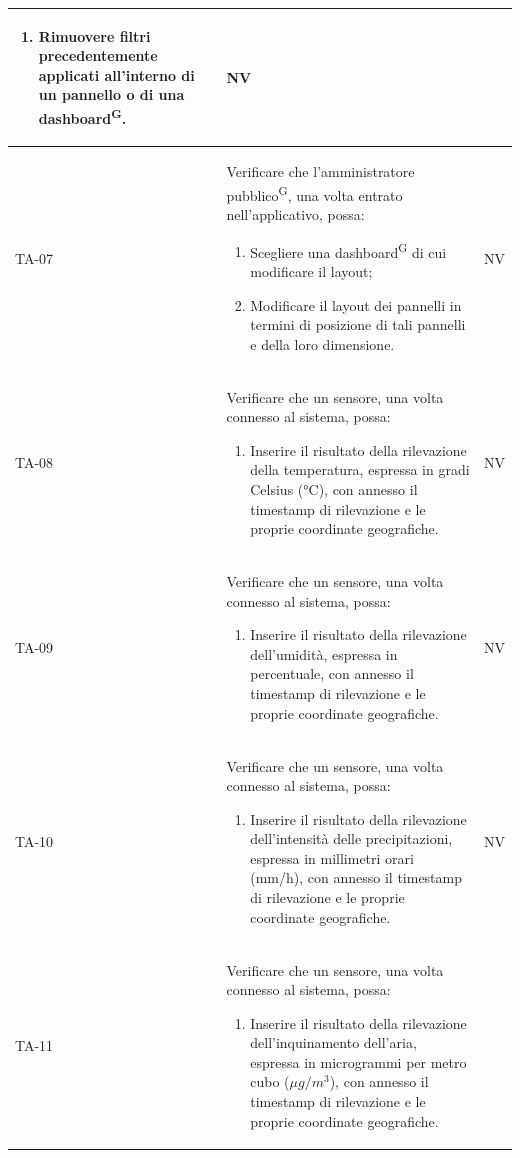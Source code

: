 \documentclass[8pt]{article}
\newcommand{\glossterm}[1]{#1\textsuperscript{G}} %
\begin{document}
\begin{longtable}{|>{\centering}p{2cm}|>{\RaggedRight}m{12cm}|>{\centering\arraybackslash}p{2cm}|}
\begin{enumerate}
            di tempo, all’interno di un’intera \glossterm{dashboard}.
        \item Rimuovere filtri precedentemente applicati all'interno di un pannello o di una \glossterm{dashboard}.
    \end{enumerate}
    & NV \\
    \hline
    TA-07 & Verificare che l’\glossterm{amministratore pubblico}, una volta entrato
    nell’applicativo, possa:
    \begin{enumerate}
        \item Scegliere una \glossterm{dashboard} di cui modificare il layout;
        \item Modificare il layout dei pannelli in termini di posizione di tali pannelli e della loro dimensione.
    \end{enumerate}
    & NV \\
    \hline
    TA-08 &
    Verificare che un sensore, una volta connesso al sistema, possa:
    \begin{enumerate}
        \item Inserire il risultato della rilevazione della temperatura, espressa in gradi Celsius
            (°C), con annesso il timestamp di rilevazione e le proprie coordinate geografiche.        
    \end{enumerate}
    & NV \\
    \hline
    TA-09 &
    Verificare che un sensore, una volta connesso al sistema, possa:
    \begin{enumerate}
    \item Inserire il risultato della rilevazione dell’umidità, espressa in percentuale, con annesso il timestamp di rilevazione e le proprie coordinate geografiche.
    \end{enumerate}
    & NV \\
    \hline
    TA-10 &
    Verificare che un sensore, una volta connesso al sistema, possa:
    \begin{enumerate}
    \item Inserire il risultato della rilevazione dell'intensità delle precipitazioni, espressa in millimetri orari (mm/h), con annesso il timestamp di rilevazione e le proprie coordinate geografiche.
    \end{enumerate}
    & NV \\
    \hline
    TA-11 &
    Verificare che un sensore, una volta connesso al sistema, possa:
    \begin{enumerate}
    \item Inserire il risultato della rilevazione dell’inquinamento dell'aria, espressa in microgrammi per metro cubo ($\mu g / m^3$), con annesso il timestamp di rilevazione e le proprie coordinate geografiche.

\end{enumerate}
\end{longtable}
\end{document}
